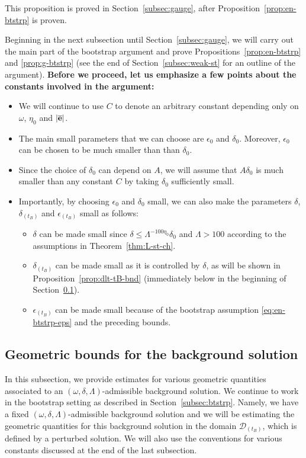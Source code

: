 \documentclass[10pt, reqno]{amsart}
\theoremstyle{definition}
\theoremstyle{remark}
\theoremstyle{conjecture}
\numberwithin{equation}{section}
\newcommand{\ep}{\epsilon}
\newcommand{\0}{\emptyset}
\newcommand{\dlt}{\delta}
\newcommand{\Lmb}{\Lambda}
\newcommand{\omg}{\omega}
\newcommand{\bfe}{{\bf e}}
\newcommand{\calD}{\mathcal D}
\newcommand{\de}{\delta}
\newcommand{\e}{\bfe}							%
\newcommand{\ebg}{\overline{\e}}					%
\begin{document}
This proposition is proved in Section~\ref{subsec:gauge}, after Proposition~\ref{prop:en-btstrp} is proven.

Beginning in the next subsection until Section~\ref{subsec:gauge}, we will carry out the main part of the bootstrap argument and prove Propositions~\ref{prop:en-btstrp} and \ref{prop:g-btstrp} (see the end of Section~\ref{subsec:weak-st} for an outline of the argument). \textbf{Before we proceed, let us emphasize a few points about the constants involved in the argument:}
\begin{itemize}
\item We will continue to use $C$ to denote an arbitrary constant depending only on $\omg$, $\eta_0$ and $|\ebg|$.
\item The main small parameters that we can choose are $\ep_0$ and $\de_0$. Moreover, $\ep_0$ can be chosen to be much smaller than than $\de_0$.
\item Since the choice of $\de_0$ can depend on $A$, we will assume that $A \de_0$ is much smaller than any constant $C$ by taking $\de_0$ sufficiently small.
\item Importantly, by choosing $\ep_0$ and $\de_0$ small, we can also make the parameters $\de$, $\de_{(t_B)}$ and $\ep_{(t_B)}$ small as follows:
\begin{itemize}
\item $\de$ can be made small since $\de\leq \Lmb^{-100\eta_0} \de_0$ and $\Lmb>100$ according to the assumptions in Theorem~\ref{thm:L-st-ch}.
\item $\dlt_{(t_B)}$ can be made small as it is controlled by $\de$, as will be shown in Proposition~\ref{prop:dlt-tB-bnd} (immediately below in the beginning of Section~\ref{subsec:bg-geom}).
\item $\ep_{(t_B)}$ can be made small because of the bootstrap assumption \eqref{eq:en-btstrp-eps} and the preceding bounds.
\end{itemize}
\end{itemize}

\subsection{Geometric bounds for the background solution} \label{subsec:bg-geom}
In this subsection, we provide estimates for various geometric quantities associated to an $(\omg, \dlt, \Lmb)$-admissible background solution. We continue to work in the bootstrap setting as described in Section~\ref{subsec:btstrp}. Namely, we have a fixed $(\omg, \dlt, \Lmb)$-admissible background solution and we will be estimating the geometric quantities for this background solution in the domain $\calD_{(t_B)}$, which is defined by a perturbed solution. We will also use the conventions for various constants discussed at the end of the last subsection.
\end{document}
